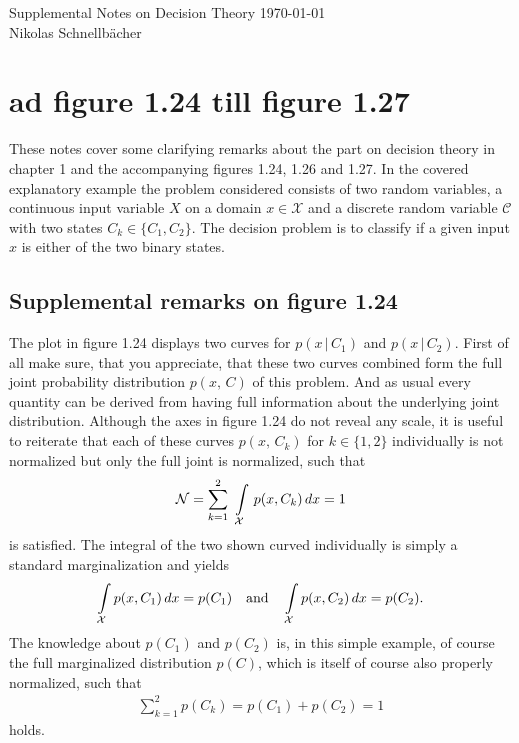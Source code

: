 \documentclass[11pt, DINA4, fleqn]{amsart}
\begin{document}
\pagestyle{fancy}

\begin{flushleft}
{\sc \Large Supplemental Notes on Decision Theory} \hfill \today \\
\medskip
Nikolas Schnellbächer \underline{\hspace{6.53in}} \\
\end{flushleft}

\section{ad figure 1.24 till figure 1.27}
These notes cover some clarifying remarks about the part on decision theory in chapter 1 and the accompanying figures 1.24, 1.26 and 1.27. In the covered explanatory example the problem considered consists of two random variables,
a continuous input variable $X$ on a domain $x\in\mathcal{X}$ and a discrete random variable $\mathcal{C}$ with two states $C_k\in \{C_1, C_2 \}$. The decision problem is to classify if a given input $x$ is either of the two binary states.

\subsection{Supplemental remarks on figure 1.24}
The plot in figure 1.24 displays two curves for $p(x \, | \, C_1)$ and $p(x \, | \, C_2)$. First of all make sure, that you appreciate, that these two curves combined
form the full joint probability distribution $p(x, \, C)$ of this problem. And as usual every quantity can be derived from having full information about the underlying joint distribution. Although the axes in figure 1.24 do not reveal any scale, it is useful to reiterate that each of these curves $p(x, \, C_k)$ for $k\in\{1, 2\}$ individually is not normalized but only the full joint is normalized, such that
\begin{align}
\mathcal{N} = \sum_{k=1}^{2} \, \, \int\displaylimits_{\mathcal{X}} \, p(x, C_k) \, dx = 1
\end{align}
is satisfied. The integral of the two shown curved individually is simply a standard marginalization and yields
\begin{align}
\int\displaylimits_{\mathcal{X}} p(x, C_1) \, dx = p(C_1) \quad  \text{and} \quad
\int\displaylimits_{\mathcal{X}} p(x, C_2) \, dx = p(C_2).
\end{align}
The knowledge about $p(C_1)$ and $p(C_2)$ is, in this simple example, of course the full marginalized distribution $p(C)$, which is itself of course also properly normalized, such that
\begin{align}
\sum_{k=1}^{2} p(C_k) = p(C_1) + p(C_2) = 1
\end{align}
holds.
\end{document}
